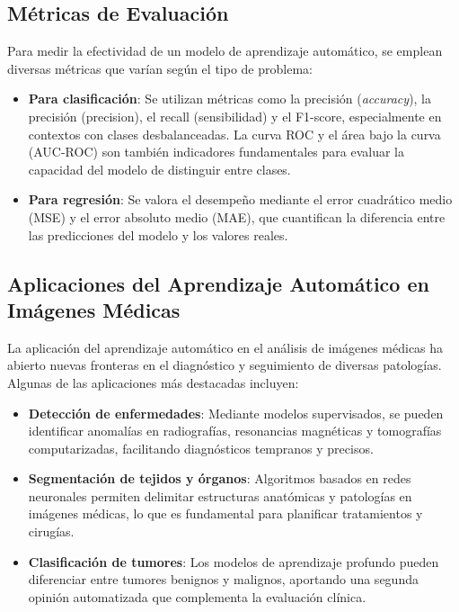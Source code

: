 \documentclass[11pt,spanish,listoffigures,listoftables]{tfgetsinf}
\begin{document}
\subsection{Métricas de Evaluación}

Para medir la efectividad de un modelo de aprendizaje automático, se emplean diversas métricas que varían según el tipo de problema:

\begin{itemize} \item \textbf{Para clasificación}: Se utilizan métricas como la precisión (\textit{accuracy}), la precisión (precision), el recall (sensibilidad) y el F1-score, especialmente en contextos con clases desbalanceadas. La curva ROC y el área bajo la curva (AUC-ROC) son también indicadores fundamentales para evaluar la capacidad del modelo de distinguir entre clases. \item \textbf{Para regresión}: Se valora el desempeño mediante el error cuadrático medio (MSE) y el error absoluto medio (MAE), que cuantifican la diferencia entre las predicciones del modelo y los valores reales. \end{itemize}

\subsection{Aplicaciones del Aprendizaje Automático en Imágenes Médicas}

La aplicación del aprendizaje automático en el análisis de imágenes médicas ha abierto nuevas fronteras en el diagnóstico y seguimiento de diversas patologías. Algunas de las aplicaciones más destacadas incluyen:

\begin{itemize} \item \textbf{Detección de enfermedades}: Mediante modelos supervisados, se pueden identificar anomalías en radiografías, resonancias magnéticas y tomografías computarizadas, facilitando diagnósticos tempranos y precisos. \item \textbf{Segmentación de tejidos y órganos}: Algoritmos basados en redes neuronales permiten delimitar estructuras anatómicas y patologías en imágenes médicas, lo que es fundamental para planificar tratamientos y cirugías. \item \textbf{Clasificación de tumores}: Los modelos de aprendizaje profundo pueden diferenciar entre tumores benignos y malignos, aportando una segunda opinión automatizada que complementa la evaluación clínica. \end{itemize}
\end{document}

